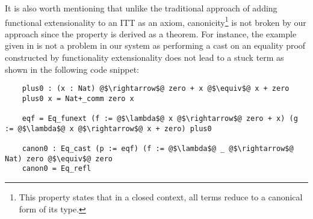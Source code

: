 \documentclass[12pt,twoside,maitrise]{dms}
\theoremstyle{definition}
\numberwithin{equation}{section}
\numberwithin{table}{chapter}
\numberwithin{figure}{chapter}
\newcommand\id[1] {\texttt{#1}}
\begin{document}



It is also worth mentioning that unlike the traditional approach of adding
functional extensionality to an ITT as an axiom, canonicity\footnote{This
property states that in a closed context, all terms reduce to a canonical form
of its type.} is not broken by our approach since the property is derived as a
theorem. For instance, the example given in\cite{altenkirch2007observational} is
not a problem in our system as performing a cast on an equality proof
constructed by functionality extensionality does not lead to a stuck term as
shown in the following code snippet:

\begin{verbatim}
    plus0 : (x : Nat) @$\rightarrow$@ zero + x @$\equiv$@ x + zero
    plus0 x = Nat+_comm zero x

    eqf = Eq_funext (f := @$\lambda$@ x @$\rightarrow$@ zero + x) (g := @$\lambda$@ x @$\rightarrow$@ x + zero) plus0

    canon0 : Eq_cast (p := eqf) (f := @$\lambda$@ _ @$\rightarrow$@ Nat) zero @$\equiv$@ zero
    canon0 = Eq_refl
\end{verbatim}
\end{document}
